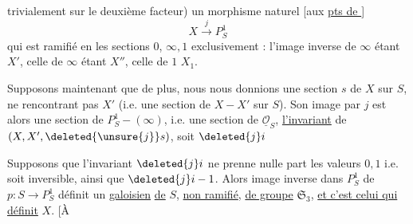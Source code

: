 trivialement sur le deuxième facteur) un morphisme naturel [aux \uline{pts de }]
\[
X\xrightarrow{j}P^1_S
\]
qui est ramifié en les sections $0$, $\infty,1$  exclusivement : l'image inverse de $\infty$ étant $X'$,  celle de $\infty$ étant $X''$, celle de $1$  $X_1$.


Supposons maintenant que de plus, nous nous donnions une section $s$ de $X$  sur $S$, ne rencontrant pas $X'$ (i.e. une section de $X-X'$ sur $S$). Son image par $j$ est alors une section de $P^1_S-(\infty)$, i.e. une section de $\underline{\mathcal O}_S$,  \uline{l'invariant} de $(X,X',\deleted{\unsure{j}}s)$, soit $\deleted{j}i$

Supposons que l'invariant $\deleted{j}i$ ne prenne nulle part les valeurs $0,1$ i.e. soit inversible, ainsi que $\deleted{j}i-1$. Alors  image inverse dans $P^1_S$ de $p:S\to P^1_S$ définit un   \uline{galoisien} \uline{de} $S$, \uline{non ramifié}, \uline{de groupe} $\mathfrak S_3$,  \uline{et c'est celui qui définit} $X$. [À 
